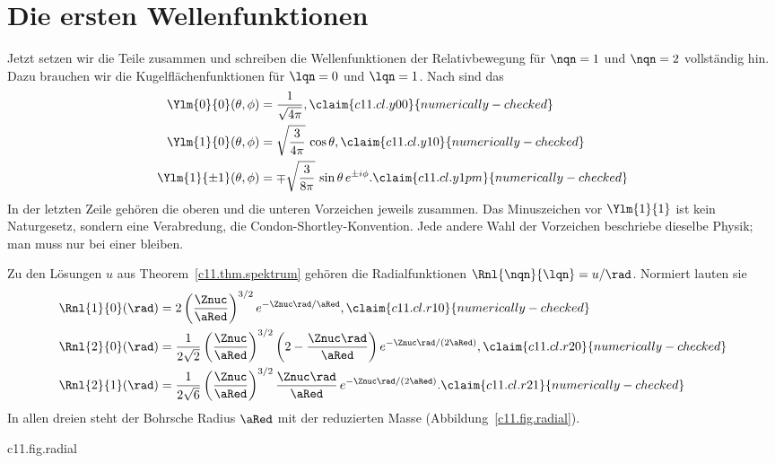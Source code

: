 \section{Die ersten Wellenfunktionen}\label{c11.s5}


Jetzt setzen wir die Teile zusammen und schreiben die Wellenfunktionen der
Relativbewegung für $\nqn = 1$ und $\nqn = 2$ vollständig hin. Dazu brauchen wir die
Kugelflächenfunktionen für $\lqn = 0$ und $\lqn = 1$. Nach  sind das
\begin{align}
  \Ylm{0}{0}(\theta, \phi) &= \frac{1}{\sqrt{4\pi}},
    \label{c11.eq.y00}\claim{c11.cl.y00}{numerically-checked} \\
  \Ylm{1}{0}(\theta, \phi) &= \sqrt{\frac{3}{4\pi}}\,\cos\theta,
    \label{c11.eq.y10}\claim{c11.cl.y10}{numerically-checked} \\
  \Ylm{1}{\pm 1}(\theta, \phi) &= \mp\sqrt{\frac{3}{8\pi}}\,\sin\theta\,e^{\pm i\phi}.
    \label{c11.eq.y1pm}\claim{c11.cl.y1pm}{numerically-checked}
\end{align}
In der letzten Zeile gehören die oberen und die unteren Vorzeichen jeweils zusammen. Das
Minuszeichen vor $\Ylm{1}{1}$ ist kein Naturgesetz, sondern eine Verabredung, die
Condon-Shortley-Konvention. Jede andere Wahl der Vorzeichen beschriebe dieselbe Physik;
man muss nur bei einer bleiben.

Zu den Lösungen $u$ aus Theorem~\ref{c11.thm.spektrum} gehören die Radialfunktionen
$\Rnl{\nqn}{\lqn} = u/\rad$. Normiert lauten sie
\begin{align}
  \Rnl{1}{0}(\rad) &= 2\left(\frac{\Znuc}{\aRed}\right)^{3/2} e^{-\Znuc\rad/\aRed},
    \label{c11.eq.r10}\claim{c11.cl.r10}{numerically-checked} \\
  \Rnl{2}{0}(\rad) &= \frac{1}{2\sqrt{2}}\left(\frac{\Znuc}{\aRed}\right)^{3/2}
    \left(2 - \frac{\Znuc\rad}{\aRed}\right) e^{-\Znuc\rad/(2\aRed)},
    \label{c11.eq.r20}\claim{c11.cl.r20}{numerically-checked} \\
  \Rnl{2}{1}(\rad) &= \frac{1}{2\sqrt{6}}\left(\frac{\Znuc}{\aRed}\right)^{3/2}
    \frac{\Znuc\rad}{\aRed}\,e^{-\Znuc\rad/(2\aRed)}.
    \label{c11.eq.r21}\claim{c11.cl.r21}{numerically-checked}
\end{align}
In allen dreien steht der Bohrsche Radius $\aRed$ mit der reduzierten Masse
(Abbildung~\ref{c11.fig.radial}).

\begin{tpcfigure}{c11.fig.radial}
  \caption{Die Radialfunktionen \eqref{c11.eq.r10} bis \eqref{c11.eq.r21} für
    $\Znuc = 1$. $\Rnl{1}{0}$ und $\Rnl{2}{0}$ sind am Ursprung von null verschieden,
    $\Rnl{2}{1}$ beginnt bei null. $\Rnl{2}{0}$ wechselt bei $\rad = 2\aRed$ das
    Vorzeichen; eine solche Nullstelle heißt Knoten.}
\end{tpcfigure}

